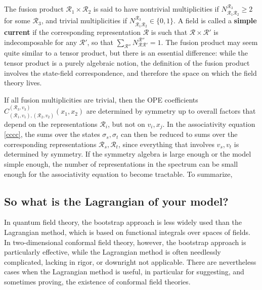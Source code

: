 \documentclass[12pt, a4paper, notitlepage, twoside]{report}
\numberwithin{equation}{section}
\theoremstyle{break}
\begin{document}
The fusion product $\mathcal{R}_1\times \mathcal{R}_2$ is said to have nontrivial multiplicities if $N_{\mathcal{R}_1\mathcal{R}_2}^{\mathcal{R}_3}\geq 2$ for some $\mathcal{R}_3$, and trivial multiplicities if $N_{\mathcal{R}_1\mathcal{R}_2}^{\mathcal{R}_3}\in \{0,1\}$.
A field is called a \textbf{\boldmath simple current} if the corresponding representation $\mathcal{R}$ is such that $\mathcal{R}\times \mathcal{R}'$ is indecomposable for any $\mathcal{R}'$, so that $\sum_{\mathcal{R}''} N_{\mathcal{R}\mathcal{R}'}^{\mathcal{R}''} =1$. 
The fusion product may seem quite similar to a tensor product, but there is an essential difference: while the tensor product is a purely algebraic notion, the definition of the fusion product involves the state-field correspondence, and therefore the space on which the field theory lives. 

If all fusion multiplicities are trivial, then the OPE coefficients  $C_{(\mathcal{R}_1,v_1),(\mathcal{R}_2,v_2)}^{(\mathcal{R}_3,v_3)}(x_1,x_2)$ are determined by symmetry up to overall factors that depend on the representations $\mathcal{R}_i$, but not on $v_i,x_j$. In the 
associativity equation \eqref{cccc}, the sums over the states $\sigma_s,\sigma_t$  can then be reduced to sums over the corresponding representations $\mathcal{R}_s,\mathcal{R}_t$, since everything that involves $v_s,v_t$ is determined by symmetry. 
If the symmetry algebra is large enough or the model simple enough, the number of representations in the spectrum can be small enough for the associativity equation to become tractable.
To summarize,
\begin{center}
\end{center}


\subsection{So what is the Lagrangian of your model? \label{seclagr}}

In quantum field theory, the bootstrap approach is less widely used than the Lagrangian method, which is based on functional integrals over spaces of fields.
In two-dimensional conformal field theory, however, the bootstrap approach is particularly effective, while the Lagrangian method is often needlessly complicated, lacking in rigor, or downright not applicable. 
There are nevertheless cases when the Lagrangian method is useful, in particular for 
suggesting, and sometimes proving, the existence of conformal field theories. 
\end{document}
